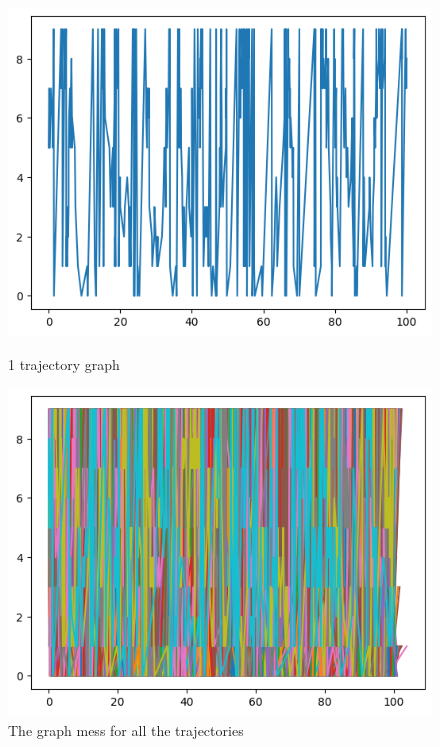 \begin{figure}[H]
    \centering
    \begin{minipage}[b]{0.49\textwidth}
        \centering
        \includegraphics[width=\textwidth]{../pictures/2.e.9.png}
        \caption*{1 trajectory graph}
    \end{minipage}
    \hfill
    \begin{minipage}[b]{0.49\textwidth}
        \centering
        \includegraphics[width=\textwidth]{../pictures/2.e.10.png}
        \caption*{The graph mess for all the trajectories}
    \end{minipage}
\end{figure}


